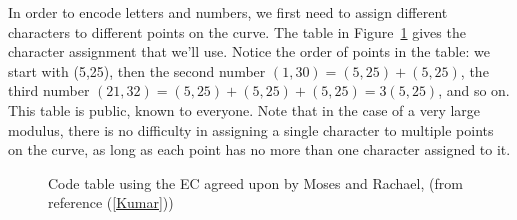 In order to encode letters and numbers, we first need to assign different characters to different points on the curve. The table in Figure~\ref{fig:DH:DHKE_17} gives the character assignment that we'll use. Notice the order of points in the table: we start with (5,25), then the second number $(1,30) =(5,25)+(5,25)$, the third number $(21,32)=(5,25)+(5,25)+(5,25)=3(5,25)$, and so on. This table is public, known to everyone. Note that in the case of a very large modulus, there is no difficulty in assigning a single character to multiple points on the curve, as long as each point has no more than one character assigned to it.

\begin{figure}[htbp]
	  \caption{\label{fig:DH:DHKE_17} Code table using the EC agreed upon by Moses and Rachael, (from reference (\ref{Kumar}))}
\end{figure}


